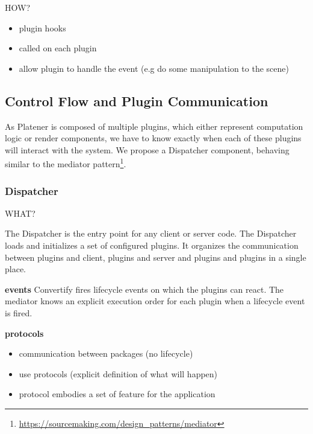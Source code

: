 \documentclass[../ClassicThesis.tex]{subfiles}
\begin{document}
HOW?

\begin{itemize}
\item plugin hooks
\item called on each plugin
\item allow plugin to handle the event (e.g do some manipulation to the scene)
\end{itemize}


\subsection{Control Flow and Plugin Communication}

As Platener is composed of multiple plugins, which either represent computation
logic or render components, we have to know exactly when each of these plugins
will interact with the system. We propose a Dispatcher component, behaving
similar to the mediator
pattern\footnote{\url{https://sourcemaking.com/design_patterns/mediator}}.

\subsubsection{Dispatcher}

WHAT?

The Dispatcher is the entry point for any client or server code. The Dispatcher
loads and initializes a set of configured plugins. It organizes the
communication between plugins and client, plugins and server and plugins and
plugins in a single place.


\textbf{events}
Convertify fires lifecycle events on which the
plugins can react. The mediator knows an explicit execution order for each
plugin when a lifecycle event is fired.

\textbf{protocols}
\begin{itemize}
\item communication between packages (no lifecycle)
\item use protocols (explicit definition of what will happen)
\item protocol embodies a set of feature for the application
\end{itemize}
\end{document}
